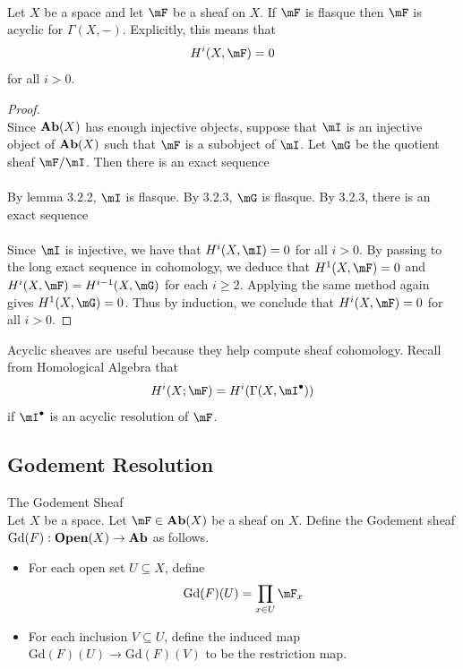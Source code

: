 \documentclass[a4paper]{article}
\begin{document}
\begin{prp}{}{}\\
Let $X$ be a space and let $\mF$ be a sheaf on $X$. If $\mF$ is flasque then $\mF$ is acyclic for $\Gamma(X,-)$. Explicitly, this means that $$H^i(X,\mF)=0$$ for all $i>0$. 
\begin{proof}\\
Since $\bold{Ab}(X)$ has enough injective objects, suppose that $\mI$ is an injective object of $\bold{Ab}(X)$ such that $\mF$ is a subobject of $\mI$. Let $\mG$ be the quotient sheaf $\mF/\mI$. Then there is an exact sequence \\
\\
By lemma 3.2.2, $\mI$ is flasque. By 3.2.3, $\mG$ is flasque. By 3.2.3, there is an exact sequence \\
\\
Since $\mI$ is injective, we have that $H^i(X,\mI)=0$ for all $i>0$. By passing to the long exact sequence in cohomology, we deduce that $H^1(X,\mF)=0$ and $H^i(X,\mF)=H^{i-1}(X,\mG)$ for each $i\geq 2$. Applying the same method again gives $H^1(X,\mG)=0$. Thus by induction, we conclude that $H^i(X,\mF)=0$ for all $i>0$. 
\end{proof}
\end{prp}

Acyclic sheaves are useful because they help compute sheaf cohomology. Recall from Homological Algebra that $$H^i(X;\mF)=H^i(\Gamma(X,\mI^\bullet))$$ if $\mI^\bullet$ is an acyclic resolution of $\mF$. 

\subsection{Godement Resolution}
\begin{defn}{The Godement Sheaf}{}\\
Let $X$ be a space. Let $\mF\in\bold{Ab}(X)$ be a sheaf on $X$. Define the Godement sheaf $\text{Gd}(F):\bold{Open}(X)\to\bold{Ab}$ as follows. 
\begin{itemize}
\item For each open set $U\subseteq X$, define $$\text{Gd}(F)(U)=\prod_{x\in U}\mF_x$$
\item For each inclusion $V\subseteq U$, define the induced map $\text{Gd}(F)(U)\to\text{Gd}(F)(V)$ to be the restriction map. 
\end{itemize}
\end{defn}
\end{document}
